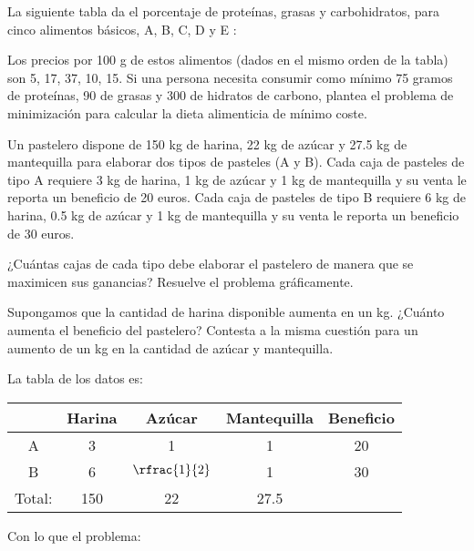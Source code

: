 \begin{problem}[3]

La siguiente tabla da el porcentaje de proteínas, grasas y carbohidratos, para cinco alimentos
básicos, A, B, C, D y E :


Los precios por 100 g de estos alimentos (dados en el mismo orden de la tabla) son 5, 17, 37, 10,
15.
%
Si una persona necesita consumir como mínimo 75 gramos de proteínas, 90 de grasas y 300 de
hidratos de carbono, plantea el problema de minimización para calcular la dieta alimenticia de mínimo coste.
\solution


\end{problem}


\begin{problem}[5]

Un pastelero dispone de 150 kg de harina, 22 kg de azúcar y 27.5 kg de mantequilla para elaborar
dos tipos de pasteles (A y B).
%
Cada caja de pasteles de tipo A requiere 3 kg de harina, 1 kg de azúcar
y 1 kg de mantequilla y su venta le reporta un beneficio de 20 euros.
%
Cada caja de pasteles de tipo
B requiere 6 kg de harina, 0.5 kg de azúcar y 1 kg de mantequilla y su venta le reporta un beneficio
de 30 euros.

\ppart ¿Cuántas cajas de cada tipo debe elaborar el pastelero de manera que se maximicen sus
ganancias? Resuelve el problema gráficamente.

\ppart Supongamos que la cantidad de harina disponible aumenta en un kg. ¿Cuánto aumenta
el beneficio del pastelero? Contesta a la misma cuestión para un aumento de un kg en la
cantidad de azúcar y mantequilla.

\label{ejer:pastelero}

\solution

La tabla de los datos es:
\begin{table}[hbtp]
\centering

\begin{tabular}{ccccc}
&Harina&Azúcar&Mantequilla&Beneficio\\\hline
A&3&1&1&20\\
B&6&$\rfrac{1}{2}$&1&30\\\hline
Total:&150&22&27.5&
\end{tabular}
\end{table}

Con lo que el problema:

\begin{ioprob}
\end{ioprob}


\end{problem}
